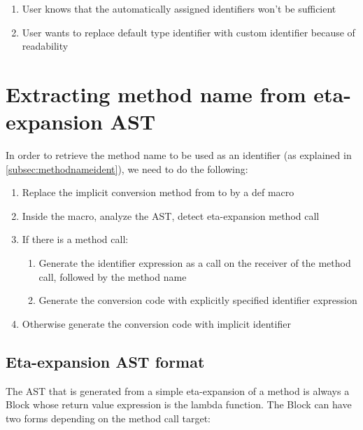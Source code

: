 \begin{enumerate}
	\item User knows that the automatically assigned identifiers won't be sufficient
	\item User wants to replace default type identifier with custom identifier because of readability
\end{enumerate}


\section{Extracting method name from eta-expansion AST}

In order to retrieve the method name to be used as an identifier (as explained in \ref{subsec:methodnameident}), we need to do the following:

\begin{enumerate}
	\item Replace the implicit conversion method from  to  by a def macro
	\item Inside the macro, analyze the AST, detect eta-expansion method call
	\item If there is a method call:
	\begin{enumerate}
		\item Generate the identifier expression as a  call on the receiver of the method call, followed by the method name
		\item Generate the conversion code with explicitly specified identifier expression
	\end{enumerate}
	\item Otherwise generate the conversion code with implicit identifier	
\end{enumerate}

\subsection{Eta-expansion AST format}

The AST that is generated from a simple eta-expansion of a method is always a Block whose return value expression is the lambda function. The Block can have two forms depending on the method call target:

